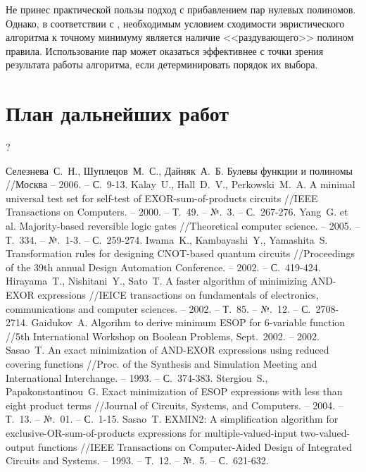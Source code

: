 \documentclass[a4paper,12pt,titlepage,finall]{article}
\begin{document}
Не принес практической пользы подход с прибавлением пар нулевых полиномов. Однако, в соответствии с \cite{convergence}, необходимым условием сходимости эвристического алгоритма к точному минимуму является наличие <<раздувающего>> полином правила. Использование пар может оказаться эффективнее с точки зрения результата работы алгоритма, если детерминировать порядок их выбора.

\newpage

\section{План дальнейших работ}

?

\newpage

\begin{raggedright}
\begin{thebibliography}{99}
     Селезнева~С.~Н., Шуплецов~М.~С., Дайняк~А.~Б. Булевы функции и полиномы //Москва – 2006. – С.~9-13.
     Kalay~U., Hall~D.~V., Perkowski~M.~A. A minimal universal test set for self-test of EXOR-sum-of-products circuits //IEEE Transactions on Computers. – 2000. – Т.~49. – №.~3. – С.~267-276.
     Yang~G. et al. Majority-based reversible logic gates //Theoretical computer science. – 2005. – Т.~334. – №.~1-3. – С.~259-274.
     Iwama~K., Kambayashi~Y., Yamashita~S. Transformation rules for designing CNOT-based quantum circuits //Proceedings of the 39th annual Design Automation Conference. – 2002. – С.~419-424.
     Hirayama~T., Nishitani~Y., Sato~T. A faster algorithm of minimizing AND-EXOR expressions //IEICE transactions on fundamentals of electronics, communications and computer sciences. – 2002. – Т.~85. – №.~12. – С.~2708-2714.
     Gaidukov~A. Algorihm to derive minimum ESOP for 6-variable function //5th International Workshop on Boolean Problems, Sept.~2002. – 2002.
     Sasao~T. An exact minimization of AND-EXOR expressions using reduced covering functions //Proc. of the Synthesis and Simulation Meeting and International Interchange. – 1993. – С.~374-383.
     Stergiou~S., Papakonstantinou~G. Exact minimization of ESOP expressions with less than eight product terms //Journal of Circuits, Systems, and Computers. – 2004. – Т.~13. – №.~01. – С.~1-15.
     Sasao~T. EXMIN2: A simplification algorithm for exclusive-OR-sum-of-products expressions for multiple-valued-input two-valued-output functions //IEEE Transactions on Computer-Aided Design of Integrated Circuits and Systems. – 1993. – Т.~12. – №.~5. – С.~621-632.

\end{thebibliography}
\end{raggedright}
\end{document}
